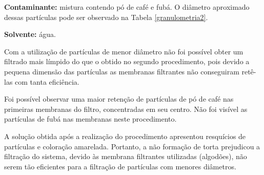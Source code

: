\textbf{Contaminante:} mistura contendo pó de café e fubá. O
diâmetro aproximado dessas partículas pode ser observado na Tabela
\ref{granulometria2}.

\textbf{Solvente:} água.

Com a utilização de partículas de menor diâmetro não foi possível obter um
filtrado mais límpido do que o obtido no segundo procedimento, pois devido a
pequena dimensão das partículas as membranas filtrantes não conseguiram retê-las
com tanta eficiência.

Foi possível observar uma maior retenção de partículas de pó de café nas
primeiras membranas do filtro, concentradas em seu centro. Não foi visível as
partículas de fubá nas membranas neste procedimento.

A solução obtida após a realização do procedimento apresentou resquícios de
partículas e coloração amarelada. Portanto, a não formação de torta prejudicou a
filtração do sistema, devido às membrana filtrantes utilizadas (algodões), não
serem tão eficientes para a filtração de partículas com menores diâmetros.




